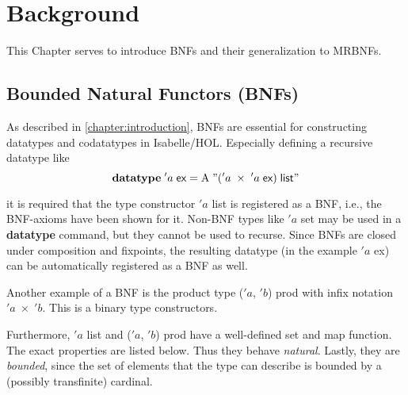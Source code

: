
\chapter{Background}
\label{chapter:background}

  This Chapter serves to introduce \acp{BNF} and their generalization to \acp{MRBNF}. 
  \section{Bounded Natural Functors (BNFs)}
    As described in \autoref{chapter:introduction}, \acp{BNF} are essential for constructing datatypes and codatatypes in Isabelle/HOL. Especially defining a recursive datatype like 
    \begin{equation*}
      \textbf{datatype}\; 'a\; \textsf{ex} = \text{A}\; "('a\; \times\; 'a\; \textsf{ex})\; \textsf{list}"
    \end{equation*}

    it is required that the type constructor \textsf{$'a$ list} is registered as a \ac{BNF}, i.e., the \ac{BNF}-axioms have been shown for it. Non-\ac{BNF} types like \textsf{$'a$ set} may be used in a \textbf{datatype} command, but they cannot be used to recurse. Since \acp{BNF} are closed under composition and fixpoints, the resulting datatype (in the example \textsf{$'a$ ex}) can be automatically registered as a \ac{BNF} as well.

    Another example of a \ac{BNF} is the product type \textsf{($'a$, $'b$) prod} with infix notation \textsf{$'a\; \times\; 'b$}. This is a binary type constructors.
    
    Furthermore, \textsf{$'a$ list} and \textsf{($'a$, $'b$) prod} have a well-defined set and map function. The exact properties are listed below. Thus they behave \textit{natural}. Lastly, they are \textit{bounded}, since the set of elements that the type can describe is bounded by a (possibly transfinite) cardinal.

